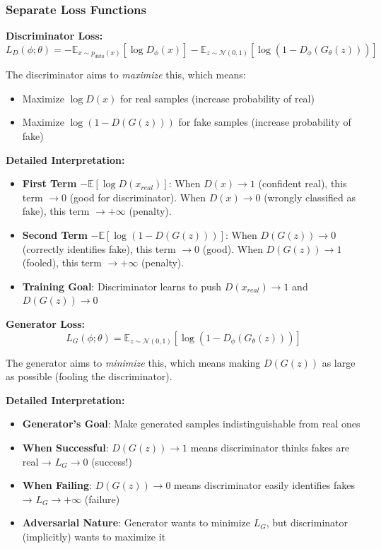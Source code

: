 \documentclass[conference,12pt]{IEEEtran}
\begin{document}
\subsubsection{Separate Loss Functions}

\textbf{Discriminator Loss:}
\begin{equation}
    L_D(\phi; \theta) = - \mathbb{E}_{x \sim p_{data}(x)}[\log D_\phi(x)] - \mathbb{E}_{z \sim \mathcal{N}(0,1)}[\log(1 - D_\phi(G_\theta(z)))]
\end{equation}

The discriminator aims to \textit{maximize} this, which means:
\begin{itemize}
    \item Maximize $\log D(x)$ for real samples (increase probability of real)
    \item Maximize $\log(1-D(G(z)))$ for fake samples (increase probability of fake)
\end{itemize}

\textbf{Detailed Interpretation:}
\begin{itemize}
    \item \textbf{First Term} $-\mathbb{E}[\log D(x_{real})]$: When $D(x) \to 1$ (confident real), this term $\to 0$ (good for discriminator). When $D(x) \to 0$ (wrongly classified as fake), this term $\to +\infty$ (penalty).
    \item \textbf{Second Term} $-\mathbb{E}[\log(1-D(G(z)))]$: When $D(G(z)) \to 0$ (correctly identifies fake), this term $\to 0$ (good). When $D(G(z)) \to 1$ (fooled), this term $\to +\infty$ (penalty).
    \item \textbf{Training Goal}: Discriminator learns to push $D(x_{real}) \to 1$ and $D(G(z)) \to 0$
\end{itemize}

\textbf{Generator Loss:}
\begin{equation}
    L_G(\phi; \theta) = \mathbb{E}_{z \sim \mathcal{N}(0,1)}[\log(1 - D_\phi(G_\theta(z)))]
\end{equation}

The generator aims to \textit{minimize} this, which means making $D(G(z))$ as large as possible (fooling the discriminator).

\textbf{Detailed Interpretation:}
\begin{itemize}
    \item \textbf{Generator's Goal}: Make generated samples indistinguishable from real ones
    \item \textbf{When Successful}: $D(G(z)) \to 1$ means discriminator thinks fakes are real → $L_G \to 0$ (success!)
    \item \textbf{When Failing}: $D(G(z)) \to 0$ means discriminator easily identifies fakes → $L_G \to +\infty$ (failure)
    \item \textbf{Adversarial Nature}: Generator wants to minimize $L_G$, but discriminator (implicitly) wants to maximize it
\end{itemize}
\end{document}
